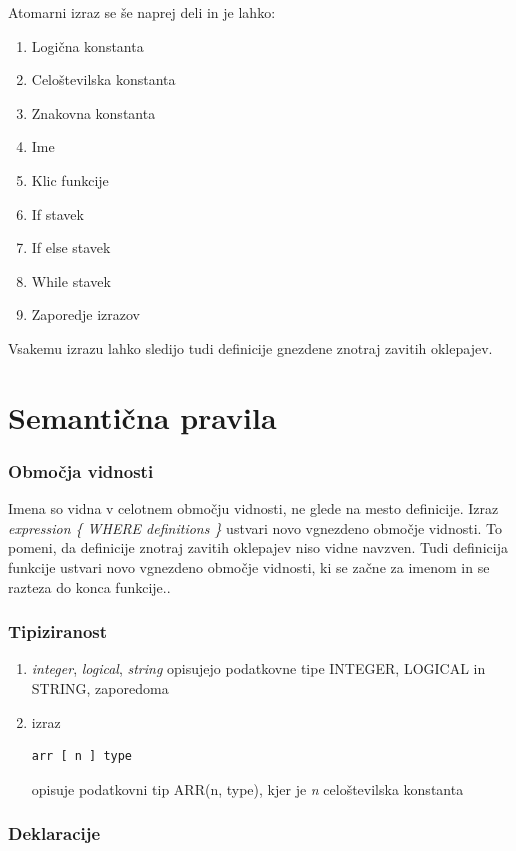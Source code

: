 \documentclass[a4paper, 12pt]{book}
\begin{document}
Atomarni izraz se še naprej deli in je lahko:
\begin{enumerate}
	\item Logična konstanta
	\item Celoštevilska konstanta
	\item Znakovna konstanta
	\item Ime
	\item Klic funkcije
	\item If stavek
	\item If else stavek
	\item While stavek
	\item Zaporedje izrazov
\end{enumerate}

Vsakemu izrazu lahko sledijo tudi definicije gnezdene znotraj zavitih oklepajev.

\section{Semantična pravila}

\subsubsection{Območja vidnosti}

Imena so vidna v celotnem območju vidnosti, ne glede na mesto definicije. Izraz \textit{expression \{ WHERE definitions \}} ustvari novo vgnezdeno območje vidnosti. To pomeni, da definicije znotraj zavitih oklepajev niso vidne navzven. Tudi definicija funkcije ustvari novo vgnezdeno območje vidnosti, ki se začne za imenom in se razteza do konca funkcije..

\subsubsection{Tipiziranost}

\begin{enumerate}
	\item \textit{integer}, \textit{logical}, \textit{string} opisujejo podatkovne tipe INTEGER, LOGICAL in STRING, zaporedoma
	\item izraz 
\begin{lstlisting}[]
	arr [ n ] type
\end{lstlisting}
	opisuje podatkovni tip ARR(n, type), kjer je \textit{n} celoštevilska konstanta 
\end{enumerate}

\subsubsection{Deklaracije}
\end{document}
